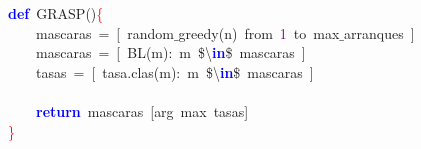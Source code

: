 \noindent
\mbox{}\textbf{\textcolor{Blue}{def}}\ GRASP\textcolor{BrickRed}{()}\textcolor{Red}{\{} \\
\mbox{}\ \ \ \ mascaras\ \textcolor{BrickRed}{=}\ \textcolor{BrickRed}{[}\ random$\_$greedy\textcolor{BrickRed}{(}n\textcolor{BrickRed}{)}\ from\ \textcolor{Purple}{1}\ to\ max$\_$arranques\ \textcolor{BrickRed}{]} \\
\mbox{}\ \ \ \ mascaras\ \textcolor{BrickRed}{=}\ \textcolor{BrickRed}{[}\ BL\textcolor{BrickRed}{(}m\textcolor{BrickRed}{):}\ m\ \$\textcolor{BrickRed}{\textbackslash{}}\textbf{\textcolor{Blue}{in}}\$\ mascaras\ \textcolor{BrickRed}{]} \\
\mbox{}\ \ \ \ tasas\ \textcolor{BrickRed}{=}\ \textcolor{BrickRed}{[}\ tasa\textcolor{BrickRed}{.}clas\textcolor{BrickRed}{(}m\textcolor{BrickRed}{):}\ m\ \$\textcolor{BrickRed}{\textbackslash{}}\textbf{\textcolor{Blue}{in}}\$\ mascaras\ \textcolor{BrickRed}{]} \\
\mbox{} \\
\mbox{}\ \ \ \ \textbf{\textcolor{Blue}{return}}\ mascaras\ \textcolor{BrickRed}{[}arg\ max\ tasas\textcolor{BrickRed}{]} \\
\mbox{}\textcolor{Red}{\}} \\
\mbox{}
